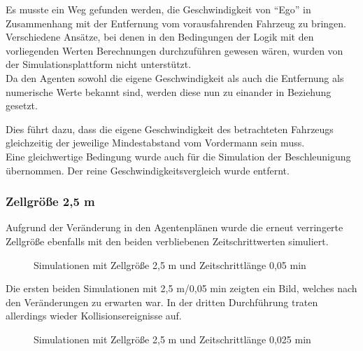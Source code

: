 Es musste ein Weg gefunden werden, die Geschwindigkeit von \enquote{Ego} in Zusammenhang mit der Entfernung vom vorausfahrenden Fahrzeug zu bringen.
\\
Verschiedene Ansätze, bei denen in den Bedingungen der Logik mit den vorliegenden Werten Berechnungen durchzuführen gewesen wären, wurden von der Simulationsplattform nicht unterstützt.
\\
Da den Agenten sowohl die eigene Geschwindigkeit als auch die Entfernung als numerische Werte bekannt sind, werden diese nun zu einander in Beziehung gesetzt.

Dies führt dazu, dass die eigene Geschwindigkeit des betrachteten Fahrzeugs gleichzeitig der jeweilige Mindestabstand vom Vordermann sein muss. 
\\
Eine gleichwertige Bedingung wurde auch für die Simulation der Beschleunigung übernommen.
Der reine Geschwindigkeitsvergleich wurde entfernt.


\subsubsection{Zellgröße 2,5 m}

Aufgrund der Veränderung in den Agentenplänen wurde die erneut verringerte Zellgröße ebenfalls mit den beiden verbliebenen Zeitschrittwerten simuliert.

\begin{figure}[hptb]
  \centering 
   \qquad 
   \qquad 
  \caption{Simulationen mit Zellgröße 2,5 m und Zeitschrittlänge 0,05 min} 
  \label{figure:run24-26}
\end{figure}

Die ersten beiden Simulationen mit 2,5 m/0,05 min zeigten ein Bild, welches nach den Veränderungen zu erwarten war.
In der dritten Durchführung traten allerdings wieder Kollisionsereignisse auf.

\begin{figure}[hptb]
  \centering 
   \qquad 
   \qquad 
  \caption{Simulationen mit Zellgröße 2,5 m und Zeitschrittlänge 0,025 min} 
  \label{figure:run27-29}
\end{figure}

